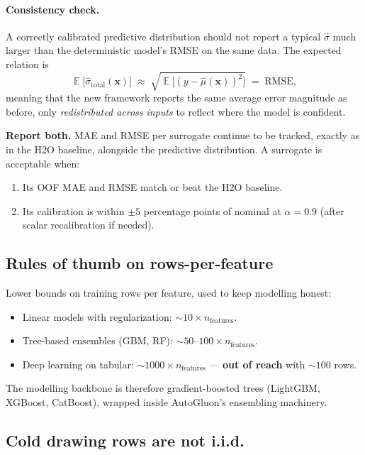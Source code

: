 \documentclass[11pt,a4paper]{article}
\DeclareMathOperator{\E}{\mathbb{E}}
\begin{document}
\paragraph{Consistency check.} A correctly calibrated predictive distribution should not report a typical $\hat\sigma$ much larger than the deterministic model's RMSE on the same data. The expected relation is
\[
\E\!\big[\hat\sigma_{\text{total}}(\bm x)\big] \;\approx\;
\sqrt{\E\!\big[(y - \hat\mu(\bm x))^2\big]} \;=\; \text{RMSE},
\]
meaning that the new framework reports the same average error magnitude as before, only \emph{redistributed across inputs} to reflect where the model is confident.

\begin{decisionbox}
\textbf{Report both.} MAE and RMSE per surrogate continue to be tracked, exactly as in the H2O baseline, alongside the predictive distribution. A surrogate is acceptable when:
\begin{enumerate}
    \item Its OOF MAE and RMSE match or beat the H2O baseline.
    \item Its calibration is within $\pm 5$ percentage points of nominal at $\alpha = 0.9$ (after scalar recalibration if needed).
\end{enumerate}
\end{decisionbox}

\subsection{Rules of thumb on rows-per-feature}

\begin{decisionbox}
Lower bounds on training rows per feature, used to keep modelling honest:
\begin{itemize}
    \item Linear models with regularization: $\sim 10 \times n_{\text{features}}$.
    \item Tree-based ensembles (GBM, RF): $\sim 50\text{--}100 \times n_{\text{features}}$.
    \item Deep learning on tabular: $\sim 1000 \times n_{\text{features}}$ --- \textbf{out of reach} with $\sim 100$ rows.
\end{itemize}
The modelling backbone is therefore gradient-boosted trees (LightGBM, XGBoost, CatBoost), wrapped inside AutoGluon's ensembling machinery.
\end{decisionbox}

\subsection{Cold drawing rows are not i.i.d.}
\end{document}

